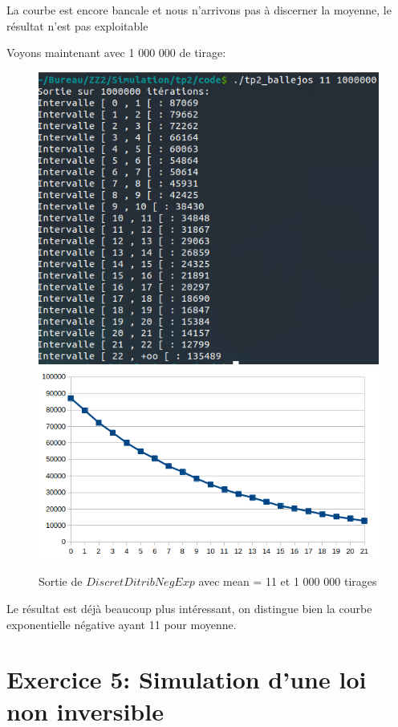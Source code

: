 \documentclass[12pt,french]{article} %
\begin{document}
La courbe est encore bancale et nous n'arrivons pas à discerner la moyenne, le résultat n'est pas exploitable

Voyons maintenant avec 1 000 000 de tirage:

\begin{figure}[H]
	\centering
	\includegraphics[scale=0.4]{exo4-6.png}
	\includegraphics[scale=0.4]{exo4-5.png}
	\caption{Sortie de $DiscretDitribNegExp$ avec mean = 11 et 1 000 000 tirages}    
\end{figure}

Le résultat est déjà beaucoup plus intéressant, on distingue bien la courbe exponentielle négative ayant 11 pour moyenne.

\newpage

\section{Exercice 5: Simulation d'une loi non inversible}
\end{document}

